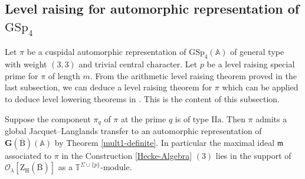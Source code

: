 \documentclass[10pt]{amsart}
\numberwithin{equation}{section}
\theoremstyle{definition}
\def\GSp{\mathrm{GSp}}
\def\calO{\mathcal{O}}
\def\fracm{\mathfrak{m}}
\def\bfG{\mathbf{G}}
\def\TT{\mathbb{T}}
\def\rma{\mathrm{a}}
\def\rmB{\mathrm{B}}
\def\rmH{\mathrm{H}}
\def\rmI{\mathrm{I}}
\def\rmZ{\mathrm{Z}}
\begin{document}
\subsection{Level raising for automorphic representation of $\GSp_{4}$} Let $\pi$ be a cuspidal automorphic representation of $\GSp_{4}(\mathbb{A})$ of general type with weight $(3,3)$ and trivial central character. Let $p$ be a level raising special prime for $\pi$ of length $m$. From the arithmetic level raising theorem proved in the last subsection, we can deduce a level raising theorem for $\pi$ which can be applied to deduce level lowering theorems in \cite{Wange}. This is the content of this subsection. 

Suppose the component $\pi_{q}$ of $\pi$ at the prime $q$ is of type $\rmI\rmI\rma$. Then $\pi$ admits a global Jacquet--Langlands transfer to an automorphic representation of $\bfG(\overline{\rmB})(\mathbb{A})$ by Theorem \ref{mult1-definite}. In particular the maximal ideal $\fracm$ associated to $\pi$ in the Construction \ref{Hecke-Algebra} $(3)$ lies in the support of $\calO_{\lambda}[\rmZ_{\rmH}(\overline{\rmB})]$ as a $\TT^{\Sigma\cup\{p\}}$-module. 
\end{document}
